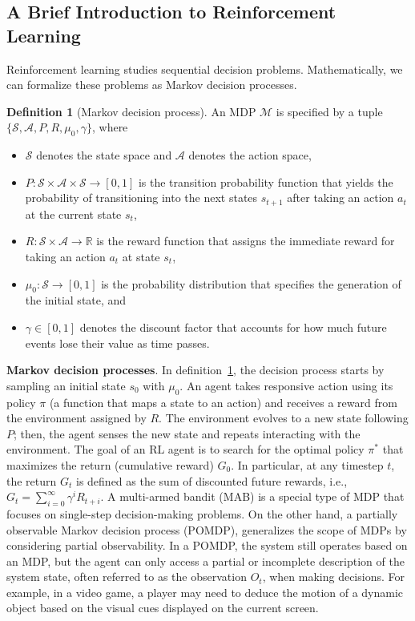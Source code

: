 \documentclass[10pt]{article} %
\theoremstyle{definition}
\newtheorem{definition}{Definition}[section]
\begin{document}
\subsection{A Brief Introduction to Reinforcement Learning}
Reinforcement learning studies sequential decision problems. Mathematically, we can formalize these problems as Markov decision processes.
\begin{definition}[Markov decision process]
\label{def:mdp}
An MDP $\mathcal{M}$ is specified by a tuple $\{\mathcal{S}, \mathcal{A}, P, R, \mu_0, \gamma\}$, where
\begin{itemize}
    \item $\mathcal{S}$ denotes the state space and $\mathcal{A}$ denotes the action space,
    \item $P: \mathcal{S} \times \mathcal{A} \times \mathcal{S} \rightarrow [0, 1]$ is the transition probability function that yields the probability of transitioning into the next states $s_{t+1}$ after taking an action $a_t$ at the current state $s_t$,
    \item $R: \mathcal{S} \times \mathcal{A} \rightarrow \mathbb{R}$ is the reward function that assigns the immediate reward for taking an action $a_t$ at state $s_t$,
    \item $\mu_0: \mathcal{S} \rightarrow [0,1]$ is the probability distribution that specifies the generation of the initial state, and
    \item $\gamma \in \left[0, 1\right]$ denotes the discount factor that accounts for how much future events lose their value as time passes.
\end{itemize}
\end{definition}
\textbf{Markov decision processes}. In definition~\ref{def:mdp}, the decision process starts by sampling an initial state $s_0$ with $\mu_0$. An agent takes responsive action using its policy $\pi$ (a function that maps a state to an action) and receives a reward from the environment assigned by $R$. The environment evolves to a new state following $P$; then, the agent senses the new state and repeats interacting with the environment. The goal of an RL agent is to search for the optimal policy $\pi^*$ that maximizes the return (cumulative reward) $G_0$. In particular, at any timestep $t$, the return $G_t$ is defined as the sum of discounted future rewards, i.e., $G_t = \sum_{i=0}^{\infty} \gamma^{i} R_{t+i}$. A multi-armed bandit (MAB) is a special type of MDP that focuses on single-step decision-making problems. On the other hand, a partially observable Markov decision process (POMDP), generalizes the scope of MDPs by considering partial observability. In a POMDP,  the system still operates based on an MDP, but the agent can only access a partial or incomplete description of the system state, often referred to as the observation $O_t$, when making decisions. For example, in a video game, a player may need to deduce the motion of a dynamic object based on the visual cues displayed on the current screen.
 
\end{document}
